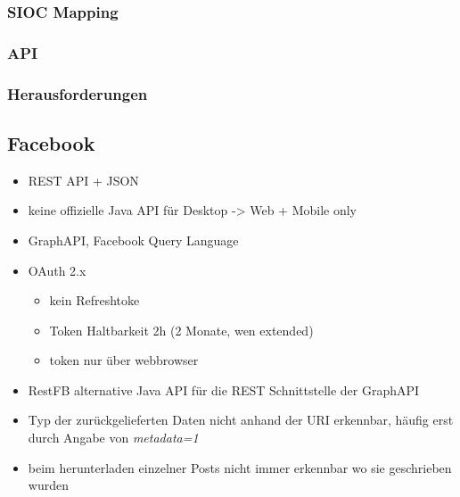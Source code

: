 \subsubsection{SIOC Mapping} %
\label{ssub:moodle_sioc_mapping}

\subsubsection{API} %
\label{ssub:moolde_api}

\subsubsection{Herausforderungen} %
\label{ssub:moodle_herausforderungen}





\subsection{Facebook} %
\label{sub:facebook_connector}

\begin{itemize}
    \item REST API + JSON
    \item keine offizielle Java API für Desktop -> Web + Mobile only
    \item GraphAPI, Facebook Query Language
    \item OAuth 2.x
    \begin{itemize}
        \item kein Refreshtoke
        \item Token Haltbarkeit 2h (2 Monate, wen extended)
        \item token nur über webbrowser
    \end{itemize}
    \item RestFB alternative Java API für die REST Schnittstelle der GraphAPI
    \item Typ der zurückgelieferten Daten nicht anhand der URI erkennbar, häufig erst durch Angabe von \emph{metadata=1}
    \item beim herunterladen einzelner Posts nicht immer erkennbar wo sie geschrieben wurden
\end{itemize}

